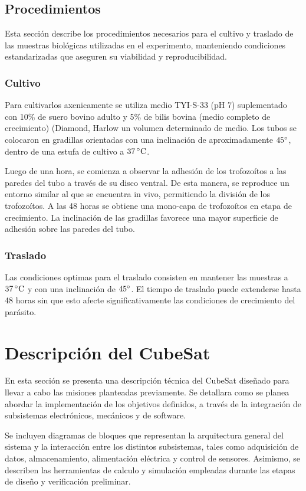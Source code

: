   \subsection{Procedimientos}
    Esta sección describe los procedimientos necesarios para el cultivo y traslado de las muestras
    biológicas utilizadas en el experimento, manteniendo condiciones estandarizadas que
    aseguren su viabilidad y reproducibilidad.

    \subsubsection{Cultivo}
    Para cultivarlos axenicamente se utiliza medio TYI-S-33 (pH 7) suplementado con 10\% de
    suero bovino adulto y 5\% de bilis bovina (medio completo de crecimiento) (Diamond, Harlow
    un volumen determinado de medio. Los tubos se colocaron en gradillas orientadas con una
    inclinación de aproximadamente $45^{\circ}$, dentro de una estufa de cultivo a $37 \,^\circ\mathrm{C}$.

    Luego de una hora, se comienza a observar la adhesión de los trofozoítos a las paredes del
    tubo a través de su disco ventral. De esta manera, se reproduce un entorno similar al que se
    encuentra in vivo, permitiendo la división de los trofozoítos. A las 48 horas se obtiene una
    mono-capa de trofozoítos en etapa de crecimiento. La inclinación de las gradillas favorece
    una mayor superficie de adhesión sobre las paredes del tubo.

    \subsubsection{Traslado}
    Las condiciones optimas para el traslado consisten en mantener las muestras a $37\,^\circ\mathrm{C}$ y con
    una inclinación de $45^{\circ}$. El tiempo de traslado puede extenderse hasta 48 horas sin que esto
    afecte significativamente las condiciones de crecimiento del parásito.

\section{Descripción del CubeSat}
En esta sección se presenta una descripción técnica del CubeSat diseñado para llevar a
cabo las misiones planteadas previamente. Se detallara como se planea abordar la implementación de
los objetivos definidos, a través de la integración de subsistemas electrónicos, mecánicos y de software.

Se incluyen diagramas de bloques que representan la arquitectura general del sistema y la
interacción entre los distintos subsistemas, tales como adquisición de datos, almacenamiento,
alimentación eléctrica y control de sensores. Asimismo, se describen las herramientas de
calculo y simulación empleadas durante las etapas de diseño y verificación preliminar.

